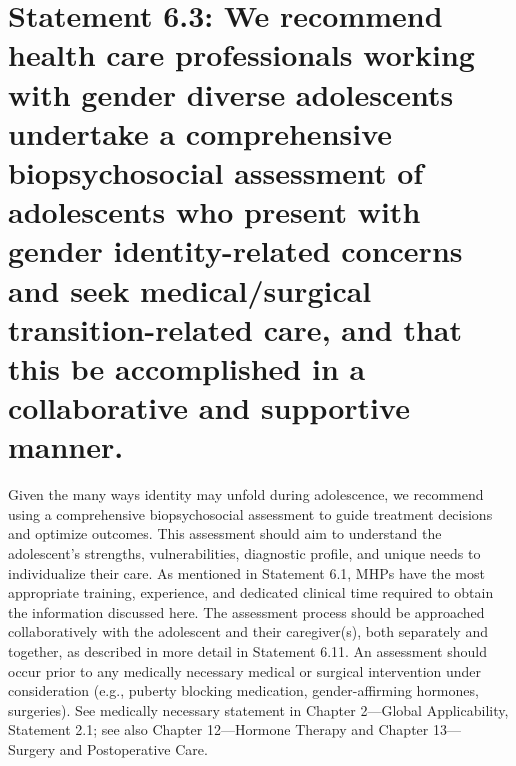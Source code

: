 \documentclass[
]{book}
\begin{document}
\hypertarget{statement-6.3-we-recommend-health-care-professionals-working-with-gender-diverse-adolescents-undertake-a-comprehensive-biopsychosocial-assessment-of-adolescents-who-present-with-gender-identity-related-concerns-and-seek-medicalsurgical-transition-related-care-and-that-this-be-accomplished-in-a-collaborative-and-supportive-manner.}{%
\section*{Statement 6.3: We recommend health care professionals working with gender diverse adolescents undertake a comprehensive biopsychosocial assessment of adolescents who present with gender identity-related concerns and seek medical/surgical transition-related care, and that this be accomplished in a collaborative and supportive manner.}\label{statement-6.3-we-recommend-health-care-professionals-working-with-gender-diverse-adolescents-undertake-a-comprehensive-biopsychosocial-assessment-of-adolescents-who-present-with-gender-identity-related-concerns-and-seek-medicalsurgical-transition-related-care-and-that-this-be-accomplished-in-a-collaborative-and-supportive-manner.}}

Given the many ways identity may unfold
during adolescence, we recommend using a comprehensive biopsychosocial assessment to guide
treatment decisions and optimize outcomes. This
assessment should aim to understand the adolescent's strengths, vulnerabilities, diagnostic profile,
and unique needs to individualize their care. As
mentioned in Statement 6.1, MHPs have the most
appropriate training, experience, and dedicated
clinical time required to obtain the information
discussed here. The assessment process should
be approached collaboratively with the adolescent
and their caregiver(s), both separately and
together, as described in more detail in Statement
6.11. An assessment should occur prior to any
medically necessary medical or surgical intervention under consideration (e.g., puberty blocking
medication, gender-affirming hormones, surgeries). See medically necessary statement in Chapter
2---Global Applicability, Statement 2.1; see also
Chapter 12---Hormone Therapy and Chapter 13---
Surgery and Postoperative Care.
\end{document}
